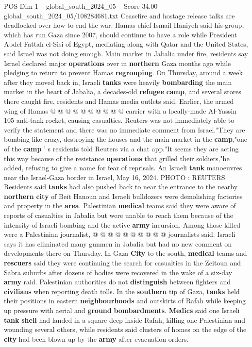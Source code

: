 \begin{textsample}{POS Dim 1 – global\_south\_2024\_05 – Score 34.00 – global\_south\_2024\_05/108284681.txt}
Ceasefire and hostage release talks are deadlocked over how to end the war.
Hamas chief Ismail Haniyeh said his group, which has run Gaza since 2007, should continue to have a role while President Abdel Fattah el-Sisi of Egypt, mediating along with Qatar and the United States, said Israel was not doing enough.
Main market in Jabalia under fire, residents say Israel declared major \textbf{operations} over in \textbf{northern} Gaza months ago while pledging to return to prevent Hamas \textbf{regrouping}.
On Thursday, around a week after they moved back in, Israeli \textbf{tanks} were heavily \textbf{bombarding} the main market in the heart of Jabalia, a decades-old \textbf{refugee} \textbf{camp}, and several stores there caught fire, residents and Hamas media outlets said.
Earlier, the armed wing of Hamas @ @ @ @ @ @ @ @ @ @ carrier with a locally-made Al-Yassin 105 anti-tank rocket, causing casualties.
Reuters was not immediately able to verify the statement and there was no immediate comment from Israel."They are bombing like crazy, destroying the houses and the main market in the \textbf{camp},"one of the \textbf{camp} ' s residents told Reuters via a chat app."It seems they are acting this way because of the resistance \textbf{operations} that grilled their soldiers,"he added, refusing to give a name for fear of reprisals.
An Israeli \textbf{tank} manoeuvres near the Israel-Gaza border in Israel, May 16, 2024.
PHOTO : REUTERS Residents said \textbf{tanks} had also pushed back to near the entrance to the nearby \textbf{northern} \textbf{city} of Beit Hanoun and Israeli bulldozers were demolishing factories and property in the \textbf{area}.
Palestinian \textbf{medical} teams said they were aware of reports of casualties in Jabalia but were unable to reach them because of the intensity of Israeli bombing and the active \textbf{army} incursion.
Among those killed were a Palestinian journalist, @ @ @ @ @ @ @ @ @ @ journalists said.
Israeli says it has eliminated many gunmen in Jabalia but had no new comment on developments there on Thursday.
In Gaza \textbf{City} to the south, \textbf{medical} teams and \textbf{rescuers} said they were continuing the search for casualties in the Zeitoun and Sabra suburbs after dozens of bodies were recovered in the wake of a six-day \textbf{army} raid.
Palestinian authorities do not \textbf{distinguish} between fighters and \textbf{civilians} when reporting death tolls.
In the \textbf{southern} tip of Gaza, \textbf{tanks} held their positions in eastern \textbf{neighbourhoods} and outskirts of Rafah while keeping up pressure with aerial and \textbf{ground} \textbf{bombardments}. \textbf{Medics} said one Israeli \textbf{tank} \textbf{shell} had landed in a square deep inside Rafah, killing one Palestinian and wounding several others, while residents said clusters of homes on the edge of the \textbf{city} had been blown up by the \textbf{army} after evacuation orders.

\end{textsample}
